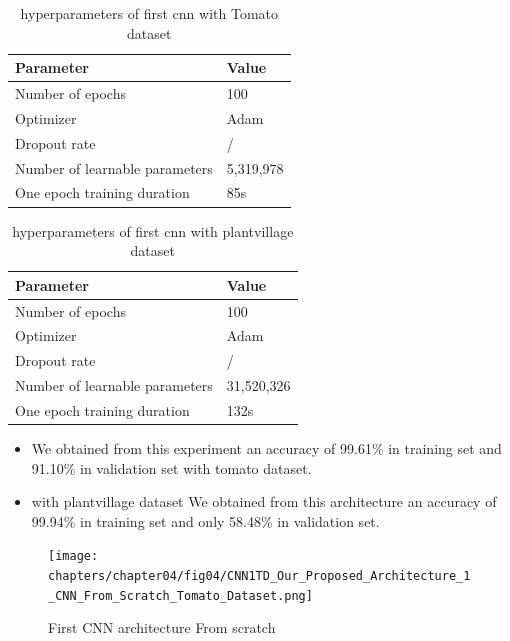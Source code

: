\begin{table}[h]
\begin{tabular}{@{}|p{9cm}|p{3cm}|@{}}
\hline
 \centering \textbf{Parameter} & \textbf{Value}  \\ \hline
 Number of epochs & 100  \\  \hline
 Optimizer & Adam \\ \hline
 Dropout rate & / \\ \hline
 Number of learnable parameters & 5,319,978 \\ \hline
 One epoch training duration & 85s \\ \hline
 
\end{tabular}
\caption{hyperparameters of first cnn with Tomato dataset}
\end{table}

\begin{table}[h]
\begin{tabular}{@{}|p{9cm}|p{3cm}|@{}}
\hline
 \centering \textbf{Parameter} & \textbf{Value}  \\ \hline
 Number of epochs & 100  \\  \hline
 Optimizer & Adam \\ \hline
 Dropout rate & / \\ \hline
 Number of learnable parameters & 31,520,326 \\ \hline
 One epoch training duration & 132s \\ \hline
 
\end{tabular}
\caption{hyperparameters of first cnn with plantvillage dataset}
\end{table}
\begin{itemize}
    \item We obtained from this experiment an accuracy of 99.61\% in training set and 91.10\% in validation set with tomato dataset.
    \item with plantvillage dataset We obtained from this architecture an accuracy of 99.94\% in training set and only 58.48\% in validation set.
\end{itemize}
\begin{figure}[h]
    \centering
    \texttt{[image: chapters/chapter04/fig04/CNN1TD\_Our\_Proposed\_Architecture\_1\_CNN\_From\_Scratch\_Tomato\_Dataset.png]}
    \caption{First CNN architecture From scratch}
    \label{fig:my_label}
\end{figure}
